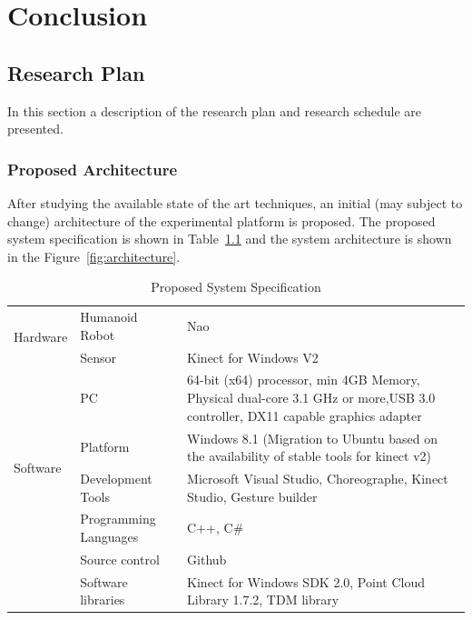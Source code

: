 
\chapter{Conclusion} %
\label{Chapter7} %
\section{Research Plan}
In this section a description of the research plan and research schedule are presented.
\subsection{Proposed Architecture}
 After studying the available state of the art techniques, an initial (may subject to change) architecture of the experimental platform is proposed. The proposed system specification is shown in Table~\ref{table:system} and the system architecture is shown in the Figure~\ref{fig:architecture}.
\begin{table}
\centering
\footnotesize
\caption{Proposed System Specification}
\label{table:system}
\begin{tabularx}{\textwidth}{X X X}
\toprule
  \multirow{2}{*}{Hardware} & Humanoid Robot & Nao \\
                            & Sensor & Kinect for Windows V2 \\
                            & PC & 64-bit (x64) processor, min 4GB Memory, Physical dual-core 3.1 GHz or more,USB 3.0 controller, DX11 capable graphics adapter\\
                                          \toprule                                       
  \multirow{2}{*}{Software} & Platform & Windows 8.1 (Migration to Ubuntu based on the availability of stable tools for kinect v2) \\
                            & Development Tools & Microsoft Visual Studio, Choreographe, Kinect Studio, Gesture builder \\
                            & Programming Languages & C++, C\# \\
                            & Source control & Github \\
                            & Software libraries & Kinect for Windows SDK 2.0, Point Cloud Library 1.7.2, TDM library 
                                          \tabularnewline\toprule
\end{tabularx}
\end{table}
